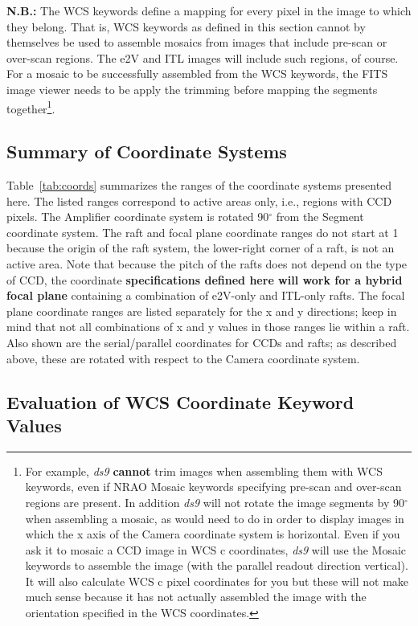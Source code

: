 \documentclass{article}[12pt]
\begin{document}
{{\bf N.B.:}  The WCS keywords define a mapping for every pixel in the image to which they belong.  That is, WCS keywords as defined in this section cannot by themselves be used to assemble mosaics from images that include pre-scan or over-scan regions.  The e2V and ITL images will include such regions, of course.  For a mosaic to be successfully assembled from the WCS keywords, the FITS image viewer needs to be apply the trimming before mapping the segments together\footnote{For example, {\it ds9} {\bf cannot} trim images when assembling them with WCS keywords, even if NRAO Mosaic keywords specifying pre-scan and over-scan regions are present.  In addition {\it ds9} will not rotate the image segments by 90$^\circ$ when assembling a mosaic, as would need to do in order to display images in which the x axis of the Camera coordinate system is horizontal.  Even if you ask it to mosaic a CCD image in WCS c coordinates, {\it ds9} will use the Mosaic keywords to assemble the image (with the parallel readout direction vertical).  It will also calculate WCS c pixel coordinates for you but these will not make much sense because it has not actually assembled the image with the orientation specified in the WCS coordinates.}.

\subsection{Summary of Coordinate Systems}
Table~\ref{tab:coords} summarizes the ranges of the coordinate systems presented here.  The listed ranges correspond to active areas only, i.e., regions with CCD pixels.  The Amplifier coordinate system is rotated 90$^\circ$ from the Segment coordinate system.  The raft and focal plane coordinate ranges do not start at 1 because the origin of the raft system, the lower-right corner of a raft, is not an active area.  Note that because the pitch of the rafts does not depend on the type of CCD, the coordinate {\bf specifications defined here will work for a hybrid focal plane} containing a combination of e2V-only and ITL-only rafts.  The focal plane coordinate ranges are listed separately for the x and y directions; keep in mind that not all combinations of x and y values in those ranges lie within a raft.  Also shown are the serial/parallel coordinates for CCDs and rafts; as described above, these are rotated with respect to the Camera coordinate system.

\subsection{Evaluation of WCS Coordinate Keyword Values\label{sec:wcscoords}}

}
\end{document}
